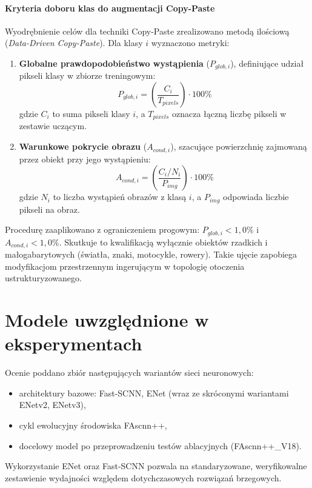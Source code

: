 \paragraph{Kryteria doboru klas do augmentacji Copy-Paste}
Wyodrębnienie celów dla techniki Copy-Paste zrealizowano metodą ilościową (\textit{Data-Driven Copy-Paste}). Dla klasy $i$ wyznaczono metryki:
\begin{enumerate}
    \item \textbf{Globalne prawdopodobieństwo wystąpienia} ($P_{glob, i}$), definiujące udział pikseli klasy w zbiorze treningowym:
    \begin{equation}
        P_{glob, i} = \left( \frac{C_i}{T_{pixels}} \right) \cdot 100\%
    \end{equation}
    gdzie $C_i$ to suma pikseli klasy $i$, a $T_{pixels}$ oznacza łączną liczbę pikseli w zestawie uczącym.
    
    \item \textbf{Warunkowe pokrycie obrazu} ($A_{cond, i}$), szacujące powierzchnię zajmowaną przez obiekt przy jego wystąpieniu:
    \begin{equation}
        A_{cond, i} = \left( \frac{C_i / N_i}{P_{img}} \right) \cdot 100\%
    \end{equation}
    gdzie $N_i$ to liczba wystąpień obrazów z klasą $i$, a $P_{img}$ odpowiada liczbie pikseli na obraz.
\end{enumerate}

Procedurę zaaplikowano z ograniczeniem progowym: $P_{glob, i} < 1,0\%$ i $A_{cond, i} < 1,0\%$. Skutkuje to kwalifikacją wyłącznie obiektów rzadkich i małogabarytowych (światła, znaki, motocykle, rowery). Takie ujęcie zapobiega modyfikacjom przestrzennym ingerującym w topologię otoczenia ustrukturyzowanego.

\section{Modele uwzględnione w eksperymentach}
Ocenie poddano zbiór następujących wariantów sieci neuronowych:
\begin{itemize}
  \item architektury bazowe: Fast-SCNN, ENet (wraz ze skróconymi wariantami ENetv2, ENetv3),
  \item cykl ewolucyjny środowiska FAscnn++,
  \item docelowy model po przeprowadzeniu testów ablacyjnych (FAscnn++\_V18).
\end{itemize}
Wykorzystanie ENet oraz Fast-SCNN pozwala na standaryzowane, weryfikowalne zestawienie wydajności względem dotychczasowych rozwiązań brzegowych.

